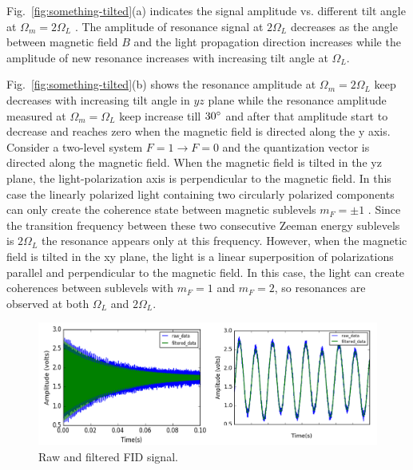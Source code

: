 Fig.~\ref{fig:something-tilted}(a) indicates the signal amplitude vs. different tilt angle at $\Omega_m=2\Omega_L$ . The amplitude of resonance signal at $2\Omega_L$  decreases as the angle between magnetic field $B$ and the light propagation direction increases while the amplitude of new resonance  increases with increasing tilt angle at $\Omega_L$.
      
Fig.~\ref{fig:something-tilted}(b) shows the resonance amplitude at $\Omega_m=2\Omega_L$ keep decreases with increasing tilt angle in $yz$ plane while  the resonance amplitude measured at $\Omega_m=\Omega_L$ keep increase till $30\degree$ and after that amplitude start to decrease and reaches zero when the magnetic field is directed along the y axis. Consider a two-level system $F=1\rightarrow F=0$ and the quantization vector is directed along the magnetic field. When the magnetic field is tilted in the yz plane, the light-polarization axis is perpendicular to the magnetic field. In this case the linearly polarized light containing two circularly polarized components can only create the coherence state between magnetic sublevels $m_F=\pm 1$ . Since the transition frequency between these two consecutive Zeeman energy sublevels is $2\Omega_L$  the resonance appears only at this frequency. However, when the magnetic field is tilted  in the xy plane, the light is a linear superposition of polarizations parallel and perpendicular to the magnetic field. In this case, the light can create coherences between sublevels with $m_F=1$ and $m_F=2$, so resonances are observed at both $\Omega_L $ and $2\Omega_L$. 
 \begin{figure}[h]
\centering\includegraphics[width=0.9\linewidth]{figures/filtered_data.png}
\caption{Raw and filtered FID signal.}
\end{figure}
 

